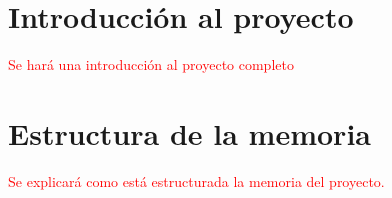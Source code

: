 
\section{Introducción al proyecto}
\textcolor{red}{Se hará una introducción al proyecto completo}

\section{Estructura de la memoria}
\textcolor{red}{Se explicará como está estructurada la memoria del proyecto.}
